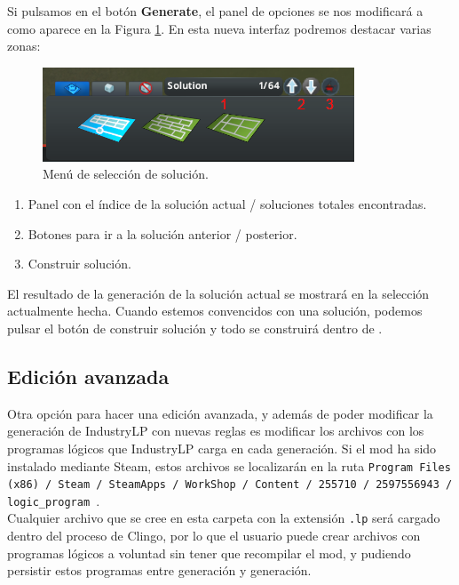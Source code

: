 Si pulsamos en el botón \textbf{Generate}, el panel de opciones se nos modificará a como aparece en la Figura \ref{fig:solutions}. En esta nueva interfaz podremos destacar varias zonas:

\begin{figure}[h]
	\centering
	\includegraphics[width=\textwidth]{images/solutions}
	\caption{Menú de selección de solución.}
	\label{fig:solutions}
\end{figure}

\begin{enumerate}
    \item Panel con el índice de la solución actual / soluciones totales encontradas.
    \item Botones para ir a la solución anterior / posterior.
    \item Construir solución.
\end{enumerate}

El resultado de la generación de la solución actual se mostrará en la selección actualmente hecha. Cuando estemos convencidos con una solución, podemos pulsar el botón de construir solución y todo se construirá dentro de \cities.

\subsection{Edición avanzada}
\label{subsec:logic-files}

Otra opción para hacer una edición avanzada, y además de poder modificar la generación de IndustryLP con nuevas reglas es modificar los archivos con los programas lógicos que IndustryLP carga en cada generación. Si el mod ha sido instalado mediante Steam, estos archivos se localizarán en la ruta \texttt{Program Files (x86) / Steam / SteamApps / WorkShop / Content / 255710 / 2597556943 / logic\_program }. \\

Cualquier archivo que se cree en esta carpeta con la extensión \texttt{.lp} será cargado dentro del proceso de Clingo, por lo que el usuario puede crear archivos con programas lógicos a voluntad sin tener que recompilar el mod, y pudiendo persistir estos programas entre generación y generación.